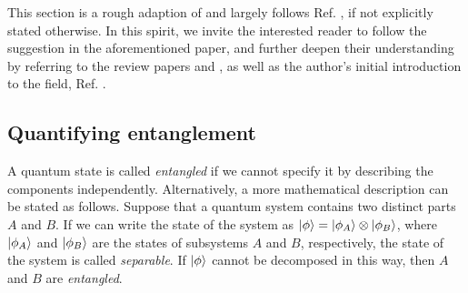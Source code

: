 
This section is a rough adaption of and largely follows Ref.
\cite{skinnerLectureNotesIntroduction2023}, if not explicitly stated otherwise.
In this spirit, we invite the interested reader to follow the suggestion in the
aforementioned paper, and further deepen their understanding by referring to
the review papers \cite{fisherRandomQuantumCircuits2023} and
\cite{potterEntanglementDynamicsHybrid2021}, as well as the author's initial
introduction to the field, Ref.
\cite{liMeasurementdrivenEntanglementTransition2019}.

\subsection{Quantifying entanglement}

A quantum state is called \emph{entangled} if we cannot specify it by
describing the components independently. Alternatively, a more mathematical description can
be stated as follows. Suppose that a quantum system contains two distinct parts
$A$ and $B$. If we can write the state of the system as $\ket{\phi} =
\ket{\phi_A} \otimes \ket{\phi_B}$, where $\ket{\phi_A}$ and $\ket{\phi_B}$ are
the states of subsystems $A$ and $B$, respectively, the state of the system is
called \emph{separable}. If $\ket{\phi}$ cannot be decomposed in this way, then
$A$ and $B$ are \emph{entangled}.

